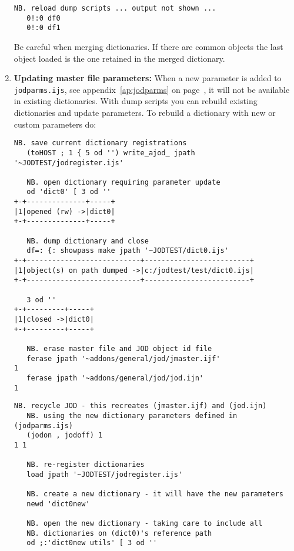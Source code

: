 \begin{enumerate}
\begin{lstlisting}[frame=single,framerule=0pt,basicstyle=\ttfamily\footnotesize]
   NB. reload dump scripts ... output not shown ...  
   0!:0 df0  
   0!:0 df1
\end{lstlisting}

Be careful when merging dictionaries. If there are common objects the last object loaded is the one
retained in the merged dictionary.


\item \textbf{Updating master file parameters:} When a new parameter is added to \texttt{jodparms.ijs}, 
see appendix~\ref{ap:jodparms} on page~\pageref{ap:jodparms}, it will not be available in existing dictionaries.
With dump scripts you can rebuild existing dictionaries and update parameters. To rebuild a dictionary with
new or custom parameters do:

\begin{lstlisting}[frame=single,framerule=0pt,basicstyle=\ttfamily\footnotesize]
   NB. save current dictionary registrations
   (toHOST ; 1 { 5 od '') write_ajod_ jpath '~JODTEST/jodregister.ijs'
   
   NB. open dictionary requiring parameter update 
   od 'dict0' [ 3 od ''
+-+--------------+-----+
|1|opened (rw) ->|dict0|
+-+--------------+-----+
   
   NB. dump dictionary and close
   df=: {: showpass make jpath '~JODTEST/dict0.ijs'
+-+---------------------------+-------------------------+
|1|object(s) on path dumped ->|c:/jodtest/test/dict0.ijs|
+-+---------------------------+-------------------------+

   3 od ''
+-+---------+-----+
|1|closed ->|dict0|
+-+---------+-----+

   NB. erase master file and JOD object id file
   ferase jpath '~addons/general/jod/jmaster.ijf'
1
   ferase jpath '~addons/general/jod/jod.ijn'
1
\end{lstlisting}

\newpage

\begin{lstlisting}[frame=single,framerule=0pt,basicstyle=\ttfamily\footnotesize]
   NB. recycle JOD - this recreates (jmaster.ijf) and (jod.ijn) 
   NB. using the new dictionary parameters defined in (jodparms.ijs)   
   (jodon , jodoff) 1
1 1

   NB. re-register dictionaries
   load jpath '~JODTEST/jodregister.ijs'

   NB. create a new dictionary - it will have the new parameters
   newd 'dict0new'
   
   NB. open the new dictionary - taking care to include all 
   NB. dictionaries on (dict0)'s reference path
   od ;:'dict0new utils' [ 3 od ''
   

\end{lstlisting}
\end{enumerate}

